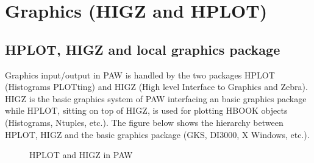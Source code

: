 
\chapter{Graphics (HIGZ and HPLOT)}

\section{HPLOT, HIGZ and local graphics package}

Graphics input/output in PAW is handled by the two packages HPLOT (Histograms 
PLOTting) and HIGZ (High level Interface to Graphics and Zebra). HIGZ is the 
basic graphics system of PAW interfacing an basic graphics package while 
HPLOT, sitting on top of HIGZ, is used for plotting HBOOK objects (Histograms, 
Ntuples, etc.). The figure below shows the hierarchy between HPLOT, HIGZ and 
the basic graphics package (GKS, DI3000, X Windows, etc.).

\begin{figure}
\begin{center}\mbox{}\end{center}
\caption{HPLOT and HIGZ in PAW}
\label{fig:GRAPH1}
\end{figure}

